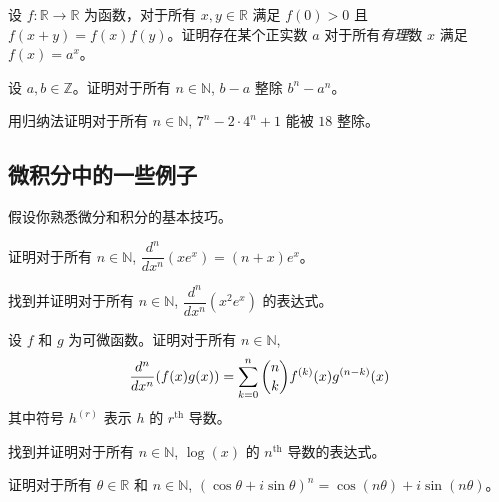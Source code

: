 \begin{chapex}
设 $f : \mathbb{R} \to \mathbb{R}$ 为函数，对于所有 $x,y \in \mathbb{R}$ 满足 $f(0) > 0$ 且 $f(x+y)=f(x)f(y)$。证明存在某个正实数 $a$ 对于所有\textit{有理}数 $x$ 满足 $f(x)=a^x$。
\end{chapex}

\begin{chapex}
设 $a,b \in \mathbb{Z}$。证明对于所有 $n \in \mathbb{N}$, $b-a$ 整除 $b^n-a^n$。
\end{chapex}

\begin{chapex}
用归纳法证明对于所有 $n \in \mathbb{N}$, $7^n - 2 \cdot 4^n + 1$ 能被 $18$ 整除。
\end{chapex}

\subsection*{微积分中的一些例子}

 假设你熟悉微分和积分的基本技巧。

\begin{chapex}
\label{cqCalculusBegin}
证明对于所有 $n \in \mathbb{N}$, $\dfrac{d^n}{dx^n}(xe^x) = (n+x)e^x$。
\end{chapex}

\begin{chapex}
找到并证明对于所有 $n \in \mathbb{N}$, $\dfrac{d^n}{dx^n}(x^2e^x)$ 的表达式。
\end{chapex}

\begin{chapex}
设 $f$ 和 $g$ 为可微函数。证明对于所有 $n \in \mathbb{N}$,
\[ \dfrac{d^n}{dx^n}(f(x)g(x)) = \sum_{k=0}^n \dbinom{n}{k} f^{(k)}(x) g^{(n-k)}(x) \]
其中符号 $h^{(r)}$ 表示 $h$ 的 $r^{\text{th}}$ 导数。
\end{chapex}

\begin{chapex}
找到并证明对于所有 $n \in \mathbb{N}$, $\log(x)$ 的 $n^{\text{th}}$ 导数的表达式。
\end{chapex}

\begin{chapex}
证明对于所有 $\theta \in \mathbb{R}$ 和 $n \in \mathbb{N}$, $(\cos \theta + i \sin \theta)^n = \cos (n\theta) + i \sin (n\theta)$。
\end{chapex}

